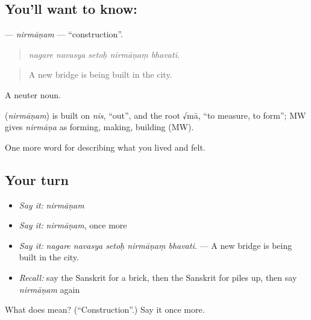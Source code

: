 \subsection*{You'll want to know: }
\textbf{} — \emph{nirmāṇam} — \textquotedblleft{}construction\textquotedblright{}.

\begin{quote}
    
\end{quote}

\begin{quote}
\emph{nagare navasya setoḥ nirmāṇaṃ bhavati.}
\end{quote}

\begin{quote}
A new bridge is being built in the city.
\end{quote}

A neuter noun.

\begin{cousinweb}
\textbf{} (\emph{nirmāṇam}) is built on \emph{nis}, \textquotedblleft{}out\textquotedblright{}, and the root √mā, \textquotedblleft{}to measure, to form\textquotedblright{}; MW gives \emph{nirmāṇa} as forming, making, building (MW).
\end{cousinweb}

\begin{grammarlens}[title={What you've built}]
One more word for describing what you lived and felt.
\end{grammarlens}

\subsection*{Your turn}
\begin{itemize}
\raggedright
  \item \emph{Say it:} \emph{nirmāṇam}
  \item \emph{Say it:} \emph{nirmāṇam}, once more
  \item \emph{Say it:} \emph{nagare navasya setoḥ nirmāṇaṃ bhavati.} — A new bridge is being built in the city.
  \item \emph{Recall:} say the Sanskrit for a brick, then the Sanskrit for piles up, then say \emph{nirmāṇam} again
\end{itemize}

\begin{tcolorbox}[breakable,colback=teal!4,colframe=teal!35!black,title={Before you move on}]
What does  mean? (\textquotedblleft{}Construction\textquotedblright{}.) Say it once more.
\end{tcolorbox}
